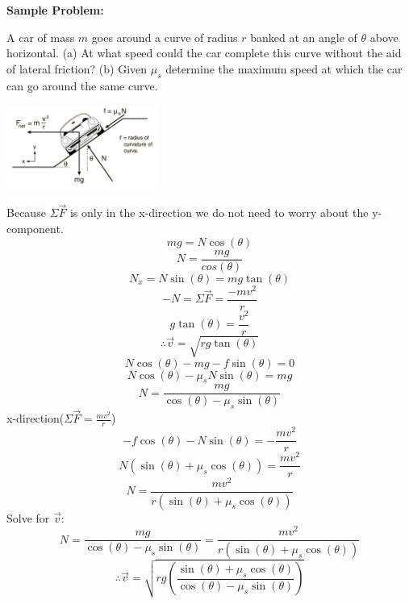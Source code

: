 \documentclass{article}
\begin{document}
		\textbf{Sample Problem:}
        \begin{multicols}{2}
            A car of mass $m$ goes around a curve of radius $r$ banked at an angle of $\theta$ above horizontal. (a) At what speed could the car complete this curve without the aid of lateral friction? (b) Given $\mu_s$ determine the maximum speed at which the car can go around the same curve.
            \centerline{\includegraphics[width=5cm]{bankedCurve.png}}
            Because $\Sigma\vec{F}$ is only in the x-direction we do not need to worry about the y-component.
            \[
            	mg=N\cos(\theta)
            \]
            \[
            	N=\frac{mg}{cos(\theta)}
            \]
            \[
            	N_x=N\sin(\theta)=mg\tan(\theta)
            \]
            \[
            	-N=\Sigma\vec{F}=\frac{-mv^2}{r}
            \]
            \[
            	g\tan(\theta)=\frac{v^2}{r}
            \]
            \[
            	\therefore \vec{v}=\sqrt{rg\tan(\theta)}
            \]
            \vfill
		\columnbreak
            \[
            	N\cos(\theta)-mg-f\sin(\theta)=0
            \]
            \[
            	N\cos(\theta)-\mu_sN\sin(\theta)=mg
            \]
            \[
            	N=\frac{mg}{\cos(\theta)-\mu_s\sin(\theta)}
            \]
            x-direction($\Sigma\vec{F}=\frac{mv^2}{r}$)
            \[
            	-f\cos(\theta)-N\sin(\theta)=-\frac{mv^2}{r}
			\]
            \[
            	N(\sin(\theta)+\mu_s\cos(\theta))=\frac{mv^2}{r}
            \]
            \[
            	N=\frac{mv^2}{r(\sin(\theta)+\mu_s\cos(\theta))}
            \]
            Solve for $\vec{v}$:
            \[
            	N=\frac{mg}{\cos(\theta)-\mu_s\sin(\theta)}=\frac{mv^2}{r(\sin(\theta)+\mu_s\cos(\theta))}
            \]
            \[
            	\therefore \vec{v}=\sqrt{rg(\frac{\sin(\theta)+\mu_s\cos(\theta)}{\cos(\theta)-\mu_s\sin(\theta)})}
            \]
        \end{multicols}
        
\end{document}
